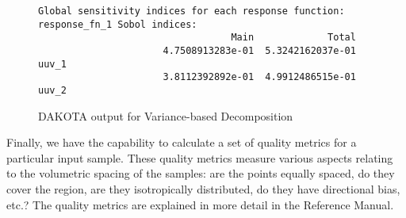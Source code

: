 \begin{figure}[ht!]
\centering
\begin{bigbox}
\begin{small}
\begin{verbatim}
Global sensitivity indices for each response function:
response_fn_1 Sobol indices:
                                  Main             Total
                      4.7508913283e-01  5.3242162037e-01 uuv_1
                      3.8112392892e-01  4.9912486515e-01 uuv_2
\end{verbatim}
\end{small}
\end{bigbox}
\caption{DAKOTA output for Variance-based Decomposition} 
\label{fig:dace:vbd}
\end{figure}

Finally, we have the capability to calculate a set of quality metrics 
for a particular input sample.  These quality metrics measure 
various aspects relating to the volumetric spacing of the samples: 
are the points equally spaced, do they cover the region, are they 
isotropically distributed, do they have directional bias, etc.? 
The quality metrics are explained in more detail in the Reference Manual.




